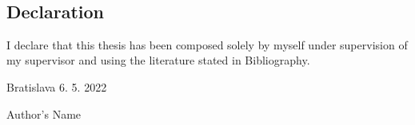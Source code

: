 
\
\vfill

\subsection*{Declaration}

I declare that this thesis has been composed solely by myself under supervision of my supervisor and using the literature stated in Bibliography.

\vspace{10pt}

\noindent Bratislava 6. 5. 2022 \hfil
\newline

\begin{flushright}
	Author's Name $\qquad$
\end{flushright}
